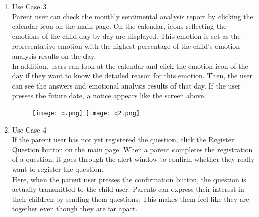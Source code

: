 \documentclass[conference]{IEEEtran}
\begin{document}
\begin{enumerate}
\begin{enumerate}
        \item Use Case 3
        \\Parent user can check the monthly sentimental analysis report by clicking the calendar icon on the main page. On the calendar, icons reflecting the emotions of the child day by day are displayed. This emotion is set as the representative emotion with the highest percentage of the child's emotion analysis results on the day. \\In addition, users can look at the calendar and click the emotion icon of the day if they want to know the detailed reason for this emotion. Then, the user can see the answers and emotional analysis results of that day. If the user presses the future date, a notice appears like the screen above.
        \begin{figure}[H]
        \centering
        \texttt{[image: q.png]}
        \texttt{[image: q2.png]}
        \end{figure}
        \item Use Case 4
        \\If the parent user has not yet registered the question, click the Register Question button on the main page. When a parent completes the registration of a question, it goes through the alert window to confirm whether they really want to register the question. \\Here, when the parent user presses the confirmation button, the question is actually transmitted to the child user. Parents can express their interest in their children by sending them questions. This makes them feel like they are together even though they are far apart.
        \begin{figure}[H]
        \centering

\end{figure}
\end{enumerate}
\end{enumerate}
\end{document}
